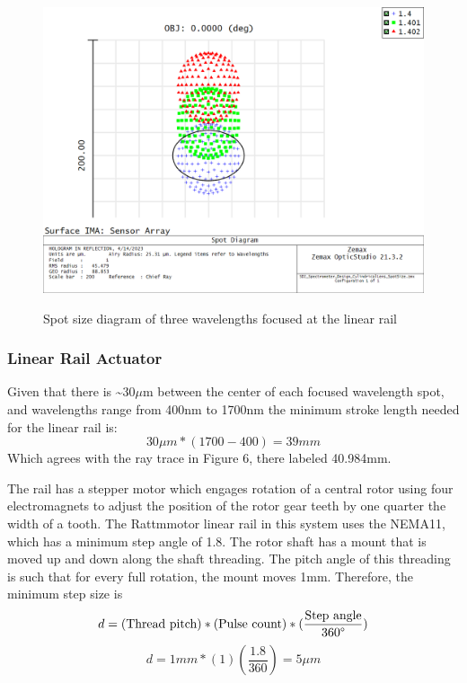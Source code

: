 \documentclass[journal]{IEEEtran}
\begin{document}
\begin{figure}[H]
    \centering
    \includegraphics[width=\linewidth]{images/SpotDiagram.png}
    \label{fig:spot-size-diagram}
    \caption{Spot size diagram of three wavelengths focused at the linear rail}
\end{figure}
\subsubsection{Linear Rail Actuator}
Given that there is \~{}30$\mu $m between the center of each focused wavelength spot, and wavelengths range from 400nm to 1700nm the minimum stroke length needed for the linear rail is:
\begin{equation}
    30\mu m*(1700-400) = 39 mm
\end{equation}
Which agrees with the ray trace in Figure 6, there labeled 40.984mm.

The rail has a stepper motor which engages rotation of a central rotor using four electromagnets to adjust the position of the rotor gear teeth by one quarter the width of a tooth. The Rattmmotor linear rail in this system uses the NEMA11, which has a minimum step angle of 1.8\textdegree. The rotor shaft has a mount that is moved up and down along the shaft threading. The pitch angle of this threading is such that for every full rotation, the mount moves 1mm. Therefore, the minimum step size is
\begin{equation}
    d = (\text{Thread pitch})*(\text{Pulse count})*(\frac{\text{Step angle}}{360\text{\textdegree}})
\end{equation}
\begin{equation}
    d = 1 mm*(1)(\frac{1.8}{360}) = 5\mu m
\end{equation}
\end{document}
